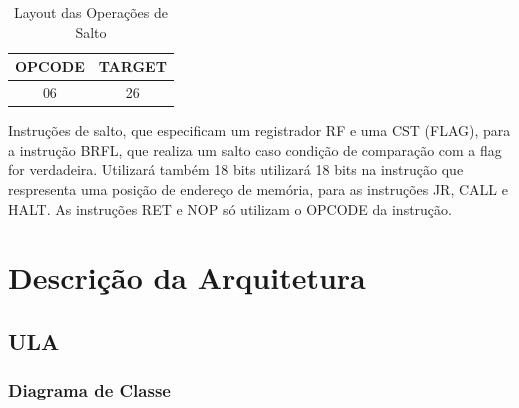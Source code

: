 \documentclass{report}
\begin{document}
\begin{itemize}
  \begin{table}[H]
\centering
	\begin{tabular}{|c|c|}
  	\hline 
  	\textbf{OPCODE} & \textbf{TARGET} \\ 
  	\hline 
  	06 & 26 \\ 
  	\hline 
  	\end{tabular} 
  	\caption{Layout das Operações de Salto}
  \end{table}
  
  Instruções de salto, que especificam um registrador RF e uma CST (FLAG), para a instrução BRFL, que realiza um salto caso condição de comparação com a flag for verdadeira. Utilizará também 18 bits  utilizará 18 bits na instrução que respresenta uma posição de endereço de memória, para as instruções JR, CALL e HALT. As instruções RET e NOP só utilizam o OPCODE da instrução.\\
  
  \end{itemize}

\chapter{Descrição da Arquitetura}

  \section{ULA}

    \subsection{Diagrama de Classe}
    \begin{figure}[H]
	\centering
      \end{figure}      
     
\end{document}
